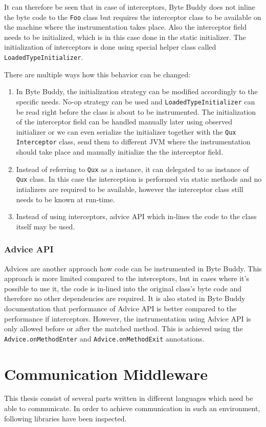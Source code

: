 It can therefore be seen that in case of interceptors, Byte Buddy does not inline the byte code to the \texttt{Foo} class but requires the interceptor class to be available on the machine where the instrumentation takes place. Also the interceptor field needs to be initialized, which is in this case done in the static initializer. The initialization of interceptors is done using special helper class called \texttt{LoadedTypeInitializer}.

There are multiple ways how this behavior can be changed:
\begin{enumerate}
\item In Byte Buddy, the initialization strategy can be modified accordingly to the specific needs. No-op strategy can be used and \texttt{LoadedTypeInitializer} can be read right before the class is about to be instrumented.  The initialization of the interceptor field can be handled manually later using observed initializer or we can even serialize the initializer together with the \texttt{Qux} \texttt{Interceptor} class, send them to different JVM where the instrumentation should take place and manually initialize the the interceptor field.
\item Instead of referring to \texttt{Qux} as a instance, it can delegated to as instance of \texttt{Qux} class. In this case the interception is performed via static methods and no intializers are required to be available, however the interceptor class still needs to be known at run-time.
\item Instead of using interceptors, advice API which in-lines the code to the class itself may be used.
\end{enumerate}
\subsubsection{Advice API}
Advices are another approach how code can be instrumented in Byte Buddy. This approach is more limited compared to the interceptors, but in cases where it's possible to use it, the code is in-lined into the original class's byte code and therefore no other dependencies are required. It is also stated in Byte Buddy documentation that performance of Advice API is better compared to the performance if interceptors.
However, the instrumentation using Advice API is only allowed before or after the matched method. This is achieved using the \texttt{Advice.onMethodEnter} and \texttt{Advice.onMethodExit} annotations.

\section{Communication Middleware}
This thesis consist of several parts written in different languages which need be able to communicate. In order to achieve communication in such an environment, following libraries have been inspected.
